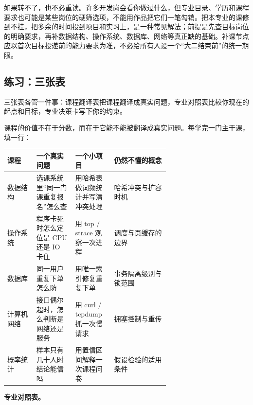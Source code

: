 \documentclass[UTF8,zihao=5,openany]{ctexbook}
\begin{document}
如果转不了，也不必重读。许多开发岗会看你做过什么，但专业目录、学历和课程要求也可能是某些岗位的硬筛选项，不能用作品把它们一笔勾销。把本专业的课修到不挂，把多余的时间投到项目和实习上，是一种常见解法；前提是先查目标岗位的明确要求，再补数据结构、操作系统、数据库、网络等真正缺的基础。补课节点应以首次目标投递前的能力要求为准，不必给所有人设一个“大二结束前”的统一期限。

\subsection{练习：三张表}
三张表各管一件事：课程翻译表把课程翻译成真实问题，专业对照表比较你现在的起点和目标，专业决策卡写下你的约束。

课程的价值不在于分数，而在于它能不能被翻译成真实问题。每学完一门主干课，填一行：

\begin{toolbox}
\begin{center}\small
\begin{tabularx}{0.94\linewidth}{p{0.18\linewidth}p{0.24\linewidth}p{0.24\linewidth}Y}
\toprule
课程 & 一个真实问题 & 一个小项目 & 仍然不懂的概念 \\
\midrule
数据结构 & 选课系统里“同一门课重复报名”怎么查 & 用哈希表做词频统计并写清冲突处理 & 哈希冲突与扩容时机 \\
操作系统 & 程序卡死时怎么定位是 CPU 还是 IO 卡住 & 用 top / strace 观察一次进程 & 调度与页缓存的边界 \\
数据库 & 同一用户重复下单怎么防 & 用唯一索引修复重复下单 & 事务隔离级别与锁范围 \\
计算机网络 & 接口偶尔超时，怎么判断是网络还是服务 & 用 curl / tcpdump 抓一次慢请求 & 拥塞控制与重传 \\
概率统计 & 样本只有几十人时结论能信吗 & 用置信区间解释一次课程问卷 & 假设检验的适用条件 \\
\bottomrule
\end{tabularx}
\end{center}
\end{toolbox}

\textbf{专业对照表。}
\end{document}
